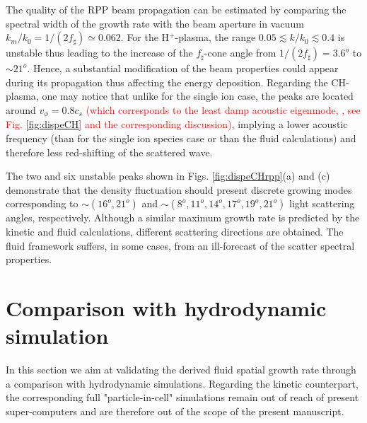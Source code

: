 \documentclass[
 reprint,
 superscriptaddress,
 amsmath,amssymb,
 aps,
]{revtex4-1}
\def\tc{\textcolor{red}}
\begin{document}
The quality of the RPP beam propagation can be estimated by comparing the spectral width of the growth rate  with the  beam aperture in vacuum $k_m/k_0=1/(2f_\sharp) \simeq 0.062$.
For the H$^+$-plasma, 
the range  $0.05 \lesssim k/k_0\lesssim 0.4$ 
is unstable thus  
leading to the increase of the $f_\sharp$-cone 
angle from $1/(2f_\sharp)=3.6^o$ to $\sim 21^o$.
Hence, a substantial modification of the beam 
properties  could appear during its propagation thus affecting the energy deposition.
Regarding the CH-plasma, one may notice that unlike for the single ion case, the peaks are located around $v_\phi=0.8c_s$ \tc{(which corresponds to the least damp acoustic eigenmode, \cite[]{POF_Fried_71,POP_Williams_95}, see Fig. \ref{fig:dispeCH} and the corresponding discussion)}, implying a lower acoustic frequency (than for the single ion species case or than the fluid calculations) and therefore less red-shifting of the scattered wave.

The two and six unstable peaks shown  in  Figs. \ref{fig:dispeCHrpp}(a) and (c) demonstrate that the density fluctuation should present discrete  growing modes corresponding to $\sim (16^o,21^o)$ and $ \sim (8^o,11^o,14^o,17^o,19^o,21^o)$ light scattering angles, respectively.
Although a similar maximum growth rate is predicted by the kinetic and fluid calculations, different scattering directions are obtained. The fluid framework  suffers, in some cases, from an ill-forecast of the scatter spectral properties. 

\section{Comparison with hydrodynamic simulation}
In this section we aim at validating the derived fluid spatial growth rate through a  comparison with hydrodynamic simulations. Regarding the kinetic counterpart, the corresponding full "particle-in-cell" simulations remain out of reach of present super-computers and are therefore out of the scope of the present manuscript. 
\end{document}
